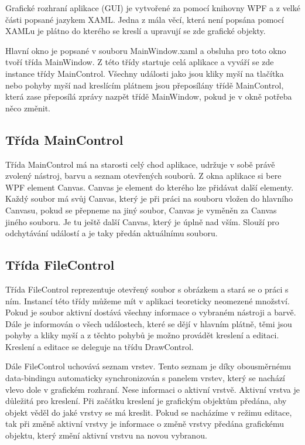 \documentclass[
  field=inf,
  biblatex,
  glossaries,
  index
]{kidiplom}
\begin{document}
Grafické rozhraní aplikace (GUI) je vytvořené za pomocí knihovny WPF a z velké části popsané jazykem XAML. Jedna z mála věcí, která není popsána pomocí XAMLu je plátno do kterého se kreslí a upravují se zde grafické objekty.

Hlavní okno je popsané v souboru MainWindow.xaml a obsluha pro toto okno tvoří třída MainWindow. Z této třídy startuje celá aplikace a vyváří se zde instance třídy MainControl. Všechny události jako jsou kliky myší na tlačítka nebo pohyby myší nad kreslícím plátnem jsou přeposílány třídě MainControl, která zase přeposílá zprávy nazpět třídě MainWindow, pokud je v okně potřeba něco změnit.

\subsection{Třída MainControl}

Třída MainControl má na starosti celý chod aplikace, udržuje v sobě právě zvolený nástroj, barvu a seznam otevřených souborů. Z okna aplikace si bere WPF element Canvas. Canvas je element do kterého lze přidávat další elementy. Každý soubor má svůj  Canvas, který je při práci na souboru vložen do hlavního Canvasu, pokud se přepneme na jiný soubor, Canvas je vyměněn za Canvas jiného souboru. Je tu ještě další Canvas, který je úplně nad vším. Slouží pro odchytávání událostí a je taky předán aktuálnímu souboru.

\subsection{Třída FileControl}

Třída FileControl reprezentuje otevřený soubor s obrázkem a stará se o práci s ním. Instancí této třídy můžeme mít v aplikaci teoreticky neomezené množství. Pokud je soubor aktivní dostává všechny informace o vybraném nástroji a barvě. Dále je informován o všech událostech, které se dějí v hlavním plátně, těmi jsou pohyby a kliky myší a z těchto pohybů je možno provádět kreslení a editaci. Kreslení a editace se deleguje na třídu DrawControl.

Dále FileControl uchovává seznam vrstev. Tento seznam je díky obousměrnému data-bindingu automaticky synchronizován s panelem vrstev, který se nachází vlevo dole v grafickém rozhraní. Nese informaci o aktivní vrstvě. Aktivní vrstva je důležitá pro kreslení. Při začátku kreslení je grafickým objektům předána, aby objekt věděl do jaké vrstvy se má kreslit. Pokud se nacházíme v režimu editace, tak při změně aktivní vrstvy je informace o změně vrstvy předána grafickému objektu, který změní aktivní vrstvu na novou vybranou.
\end{document}
